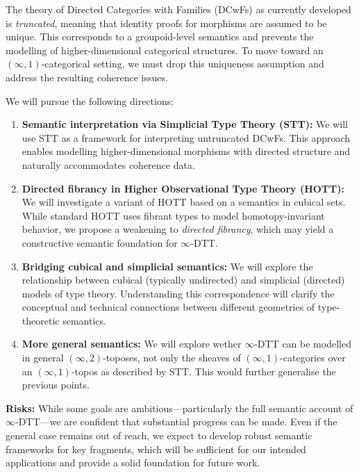 \documentclass[a4paper,11pt]{article}
\begin{document}
The theory of Directed Categories with Families (DCwFs) as currently
developed is \emph{truncated}, meaning that identity proofs for
morphisms are assumed to be unique. This corresponds to a
groupoid-level semantics and prevents the modelling of
higher-dimensional categorical structures. To move toward an
$(\infty,1)$-categorical setting, we must drop this uniqueness assumption
and address the resulting coherence issues. 

We will pursue the following directions:

\begin{enumerate}
\item \textbf{Semantic interpretation via Simplicial Type Theory
    (STT):} We will use STT as a framework for interpreting
  untruncated DCwFs. This approach enables modelling
  higher-dimensional morphisms with directed structure and naturally
  accommodates coherence data. 

\item \textbf{Directed fibrancy in Higher Observational Type Theory
    (HOTT):} We will investigate a variant of HOTT based on a
  semantics in cubical sets. While standard HOTT uses fibrant types to
  model homotopy-invariant behavior, we propose a weakening to
  \emph{directed fibrancy}, which may yield a constructive semantic
  foundation for $\infty$-DTT. 

\item \textbf{Bridging cubical and simplicial semantics:} We will
  explore the relationship between cubical (typically undirected) and
  simplicial (directed) models of type theory. Understanding this
  correspondence will clarify the conceptual and technical connections
  between different geometries of type-theoretic semantics.

\item \textbf{More general semantics:} We will explore wether
  $\infty$-DTT can be modelled in general $(\infty,2)$-toposes, not only
  the sheaves of $(\infty,1)$-categories over an $(\infty,1)$-topos as
  described by STT. This
  would further generalise the previous points.
\end{enumerate}

\textbf{Risks:} While some goals are ambitious—particularly the full
semantic account of $\infty$-DTT—we are confident that substantial
progress can be made. Even if the general case remains out of reach,
we expect to develop robust semantic frameworks for key fragments,
which will be sufficient for our intended applications and provide a
solid foundation for future work.
\end{document}
